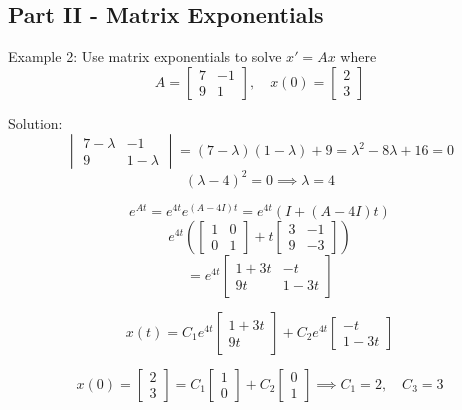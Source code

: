 \documentclass[12pt]{article}
\begin{document}
\subsection*{Part II - Matrix Exponentials}
Example 2: Use matrix exponentials to solve $x' = Ax$ where 
\[A = \begin{bmatrix}
    7 & -1\\
    9 & 1
\end{bmatrix}, \quad x(0) = \begin{bmatrix}
    2\\3
\end{bmatrix}\]

Solution:
\[\begin{vmatrix}
    7 - \lambda & -1\\
    9 & 1 - \lambda
\end{vmatrix} = (7 - \lambda)(1 - \lambda) + 9 = \lambda^2 - 8\lambda + 16 = 0\]
\[(\lambda - 4)^2 = 0 \implies \lambda = 4\]

\[e^{At} = e^{4t} e^{(A - 4I)t} = e^{4t} (I + (A - 4I)t)\]
\[e^{4t} \left(\begin{bmatrix}
    1 & 0\\
    0 & 1
\end{bmatrix} + t\begin{bmatrix}
    3 & -1\\
    9 & -3
\end{bmatrix}\right)\]
\[= e^{4t} \begin{bmatrix}
    1 + 3t & -t\\
    9t & 1 - 3t
\end{bmatrix}\]

\[x(t) = C_1 e^{4t} \begin{bmatrix}
    1 + 3t\\
    9t
\end{bmatrix} + C_2 e^{4t} \begin{bmatrix}
    -t\\
    1 - 3t
\end{bmatrix}\] 

\[x(0) = \begin{bmatrix}
    2\\3
\end{bmatrix} = C_1\begin{bmatrix}
    1\\
    0
\end{bmatrix} + C_2 \begin{bmatrix}
    0\\1
\end{bmatrix} \implies C_1 = 2, \quad C_3 = 3\]
\end{document}
